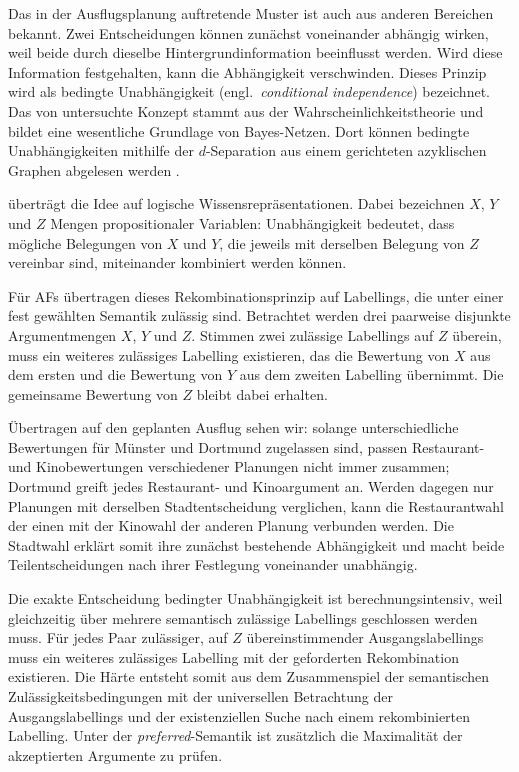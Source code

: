 Das in der Ausflugsplanung auftretende Muster ist auch aus anderen
Bereichen bekannt. Zwei Entscheidungen können zunächst voneinander
abhängig wirken, weil beide durch dieselbe Hintergrundinformation beeinflusst
werden. Wird diese Information festgehalten, kann die Abhängigkeit
verschwinden. Dieses Prinzip wird als bedingte Unabhängigkeit
(engl.\ \emph{conditional independence}) bezeichnet. Das von
\citeauthor*{pearl:paz:1986:graphoids}
\cite{pearl:paz:1986:graphoids} untersuchte Konzept stammt aus der
Wahrscheinlichkeitstheorie und bildet eine wesentliche Grundlage von
Bayes-Netzen. Dort können bedingte Unabhängigkeiten mithilfe der
\(d\)-Separation aus einem gerichteten azyklischen Graphen abgelesen
werden \cite{pearl:2010}. 

\textcite{darwiche:1997:logical-ci} überträgt die Idee auf logische
Wissensrepräsentationen. Dabei bezeichnen \(X\), \(Y\) und \(Z\) Mengen
propositionaler Variablen: Unabhängigkeit bedeutet, dass mögliche
Belegungen von \(X\) und \(Y\), die jeweils mit derselben Belegung von
\(Z\) vereinbar sind, miteinander kombiniert werden können.

Für AFs übertragen \citeauthor*{rienstra:2020:independence-af} 
\cite{rienstra:2020:independence-af} dieses
Rekombinationsprinzip auf Labellings, die unter einer fest gewählten
Semantik zulässig sind. Betrachtet werden drei paarweise disjunkte
Argumentmengen \(X\), \(Y\) und \(Z\). Stimmen zwei zulässige
Labellings auf \(Z\) überein, muss ein weiteres zulässiges Labelling
existieren, das die Bewertung von \(X\) aus dem ersten und die
Bewertung von \(Y\) aus dem zweiten Labelling übernimmt. Die gemeinsame
Bewertung von \(Z\) bleibt dabei erhalten.

Übertragen auf den geplanten Ausflug sehen wir: 
solange unterschiedliche Bewertungen für Münster und 
Dortmund zugelassen sind, passen Restaurant- und Kinobewertungen
verschiedener Planungen nicht immer zusammen; Dortmund greift jedes 
Restaurant- und Kinoargument an. Werden dagegen nur
Planungen mit derselben Stadtentscheidung verglichen, kann die
Restaurantwahl der einen mit der Kinowahl der anderen Planung verbunden
werden. Die Stadtwahl erklärt somit ihre zunächst bestehende
Abhängigkeit und macht beide Teilentscheidungen nach ihrer Festlegung
voneinander unabhängig.

Die exakte Entscheidung bedingter Unabhängigkeit ist
berechnungsintensiv, weil gleichzeitig über mehrere semantisch
zulässige Labellings geschlossen werden muss. Für jedes Paar
zulässiger, auf \(Z\) übereinstimmender Ausgangslabellings muss ein
weiteres zulässiges Labelling mit der geforderten Rekombination
existieren. Die Härte entsteht somit aus dem Zusammenspiel der
semantischen Zulässigkeitsbedingungen mit der universellen Betrachtung
der Ausgangslabellings und der existenziellen Suche nach einem
rekombinierten Labelling. Unter der \emph{preferred}-Semantik ist
zusätzlich die Maximalität der akzeptierten Argumente zu prüfen.

